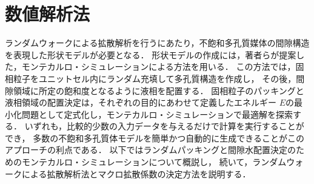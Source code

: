 \section{数値解析法}
ランダムウォークによる拡散解析を行うにあたり，不飽和多孔質媒体の間隙構造を表現した形状モデルが必要となる．
形状モデルの作成には，著者ら\cite{Kimoto}が提案した，モンテカルロ・シミュレーションによる方法を用いる．
この方法では，固相粒子をユニットセル内にランダム充填して多孔質構造を作成し，
その後，間隙領域に所定の飽和度となるように液相を配置する．
固相粒子のパッキングと液相領域の配置決定は，それぞれの目的にあわせて定義したエネルギー
$E$の最小化問題として定式化し，モンテカルロ・シミュレーションで最適解を探索する．
いずれも，比較的少数の入力データを与えるだけで計算を実行することができ，
多数の不飽和多孔質体モデルを簡単かつ自動的に生成できることがこのアプローチの利点である．
以下ではランダムパッキングと間隙水配置決定のためのモンテカルロ・シミュレーションについて概説し，
続いて，ランダムウォークによる拡散解析法とマクロ拡散係数の決定方法を説明する．
